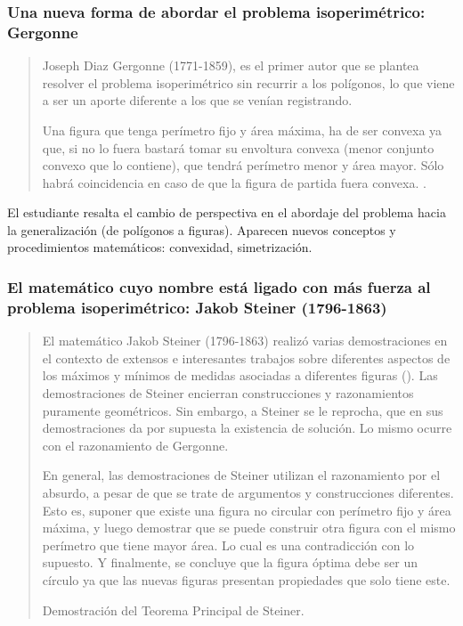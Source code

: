 \subsubsection{Una nueva forma de abordar el problema isoperimétrico: Gergonne}

\begin{quote}
	Joseph Diaz Gergonne (1771-1859), es el primer autor que se plantea resolver el problema isoperimétrico sin recurrir a los polígonos, lo que viene a ser un aporte diferente a los que se venían registrando.

	Una figura que tenga perímetro fijo y área máxima, ha de ser convexa ya que, si no lo fuera bastará tomar su envoltura convexa (menor conjunto convexo que lo contiene), que tendrá perímetro menor y área mayor. Sólo habrá coincidencia en caso de que la figura de partida fuera convexa. \textcite[6]{herrero2011}.
\end{quote}
\vspace{1em}

El estudiante resalta el cambio de perspectiva en el abordaje del problema hacia la generalización (de polígonos a figuras). Aparecen nuevos conceptos y procedimientos matemáticos: convexidad, simetrización.

\subsubsection{El matemático cuyo nombre está ligado con más fuerza al problema isoperimétrico: Jakob Steiner (1796-1863)}

\begin{quote}
	El matemático Jakob Steiner (1796-1863) realizó varias demostraciones en el contexto de extensos e interesantes trabajos sobre diferentes aspectos de los máximos y mínimos de medidas asociadas a diferentes figuras (\textcite{herrero2011}). Las demostraciones de Steiner encierran construcciones y razonamientos puramente geométricos. Sin embargo, a Steiner se le reprocha, que en sus demostraciones da por supuesta la existencia de solución. Lo mismo ocurre con el razonamiento de Gergonne.
	
	En general, las demostraciones de Steiner utilizan el razonamiento por el absurdo, a pesar de que se trate de argumentos y construcciones diferentes. Esto es, suponer que existe una figura no circular con perímetro fijo y área máxima, y luego demostrar que se puede construir otra figura con el mismo perímetro que tiene mayor área. Lo cual es una contradicción con lo supuesto. Y finalmente, se concluye que la figura óptima debe ser un círculo ya que las nuevas figuras presentan propiedades que solo tiene este.
	
	Demostración del Teorema Principal de Steiner.
\end{quote}
\vspace{1em}

